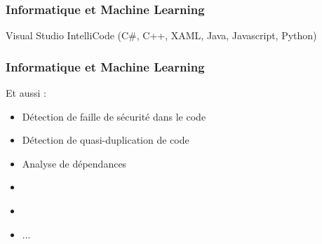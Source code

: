 \documentclass{formation}
\begin{document}
\begin{frame}
  \frametitle{Informatique et Machine Learning}
  Visual Studio IntelliCode (C\#, C++, XAML, Java, Javascript, Python)
\end{frame}

\begin{frame}
  \frametitle{Informatique et Machine Learning}
  Et aussi :
  \begin{itemize}
  \item Détection de faille de sécurité dans le code
  \item Détection de quasi-duplication de code
  \item Analyse de dépendances
  \item \href{https://www.youtube.com/watch?v=ZD8Cnzc6KlY}{}
  \item \href{http://code2vec.org/}{}
  \item ...
  \end{itemize}
\end{frame}
\end{document}

